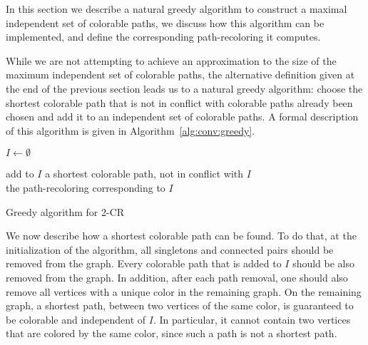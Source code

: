 \label{sec:greedy}

In this section we describe a natural greedy algorithm to construct a maximal
independent set of colorable paths, 
we discuss how this algorithm can be implemented,
and define the corresponding path-recoloring it computes.

While we are not attempting to achieve an approximation to the size
of the maximum independent set of colorable paths,
the alternative definition given at the end of the previous section
leads us to a natural greedy algorithm: 
choose the shortest colorable path that 
is not in conflict with colorable paths already been chosen and add it
to an independent set of colorable paths.
%
A formal description of this algorithm is given in
Algorithm~\ref{alg:conv:greedy}.

\begin{algorithm}
\begin{algorithmic}

\State $I \gets \emptyset$

\State add to $I$ a shortest colorable path, not in conflict with $I$ 
\EndWhile
\\
\Return the path-recoloring corresponding to $I$


\end{algorithmic}
\caption{Greedy algorithm for 2-CR}
\label{alg:conv:greedy}
\end{algorithm}

We now describe how a shortest colorable path can be found.
%
To do that, 
at the initialization of the algorithm, 
all singletons and connected pairs should be removed from the graph.  
%
Every colorable path that is added to $I$ should be also removed from the graph.  
%
In addition, 
after each path removal, 
one should also remove all vertices with a unique color in the remaining graph.  
%
On the remaining graph, 
a shortest path, 
between two vertices of the same color, 
is guaranteed to be colorable and independent of $I$.
%
In particular,
it cannot contain two vertices that are colored by the same color, 
since such a path is not a shortest path.